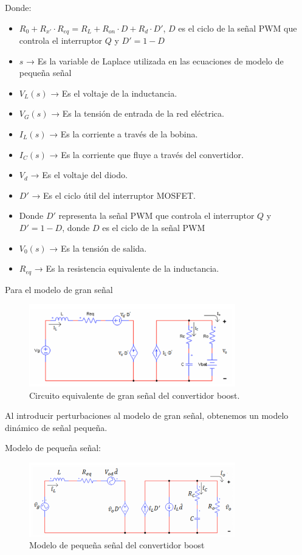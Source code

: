 Donde:
\begin{itemize}
    \item \( R_0 + R_{x'} \cdot R_{eq} = R_L + R_{on} \cdot D + R_d \cdot D' \), \( D \) es el ciclo de la señal PWM que controla el interruptor \( Q \) y \( D' = 1 - D \)
    \item \(s\) → Es la variable de Laplace utilizada en las ecuaciones de modelo de pequeña señal
    \item \(V_L(s)\) → Es el voltaje de la inductancia.
    \item \(V_G(s)\) → Es la tensión de entrada de la red eléctrica.
    \item \(I_L(s)\) → Es la corriente a través de la bobina.
    \item \(I_C(s)\) → Es la corriente que fluye a través del convertidor.
    \item \(V_d\) → Es el voltaje del diodo.
    \item \(D'\) → Es el ciclo útil del interruptor MOSFET.
    \item Donde \(D'\) representa la señal PWM que controla el interruptor \(Q\) y \(D' = 1 - D\), donde \(D\) es el ciclo de la señal PWM
    \item \(V_0(s)\) → Es la tensión de salida.
    \item \(R_{eq}\) → Es la resistencia equivalente de la inductancia.
\end{itemize}
\newpage

Para el modelo de gran señal

\begin{figure}[H] %
    \centering
    \includegraphics[width=0.8\textwidth]{3.png}
    \caption{Circuito equivalente de gran señal del convertidor boost.}
\end{figure}
Al introducir perturbaciones al modelo de gran señal, obtenemos un modelo dinámico de señal pequeña.

Modelo de pequeña señal:

\begin{figure}[h]
    \centering
    \includegraphics[width=0.8\textwidth]{2.png} %
    \caption{Modelo de pequeña señal del convertidor boost}
    \label{fig:pequena_senal}
\end{figure}

